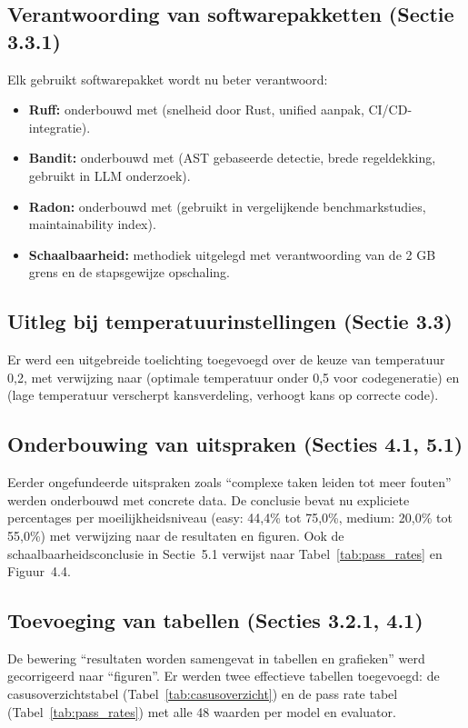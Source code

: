 \subsection{Verantwoording van softwarepakketten (Sectie 3.3.1)}
Elk gebruikt softwarepakket wordt nu beter verantwoord:
\begin{itemize}
    \item \textbf{Ruff:} onderbouwd met \autocite{brtnik2025thesis} (snelheid door Rust, unified aanpak, CI/CD-integratie).
    \item \textbf{Bandit:} onderbouwd met \autocite{Alrashedy2025} (AST gebaseerde detectie, brede regeldekking, gebruikt in LLM onderzoek).
    \item \textbf{Radon:} onderbouwd met \autocite{Bayram2025,Morrison2023} (gebruikt in vergelijkende benchmarkstudies, maintainability index).
    \item \textbf{Schaalbaarheid:} methodiek uitgelegd met verantwoording van de 2 GB grens en de stapsgewijze opschaling.
\end{itemize}

\subsection{Uitleg bij temperatuurinstellingen (Sectie 3.3)}
Er werd een uitgebreide toelichting toegevoegd over de keuze van temperatuur 0,2, met verwijzing naar \textcite{Arora2024} (optimale temperatuur onder 0,5 voor codegeneratie) en \textcite{Chen2021} (lage temperatuur verscherpt kansverdeling, verhoogt kans op correcte code).

\subsection{Onderbouwing van uitspraken (Secties 4.1, 5.1)}
Eerder ongefundeerde uitspraken zoals ``complexe taken leiden tot meer fouten'' werden onderbouwd met concrete data. De conclusie bevat nu expliciete percentages per moeilijkheidsniveau (easy: 44,4\% tot 75,0\%, medium: 20,0\% tot 55,0\%) met verwijzing naar de resultaten en figuren. Ook de schaalbaarheidsconclusie in Sectie~5.1 verwijst naar Tabel~\ref{tab:pass_rates} en Figuur~4.4.

\subsection{Toevoeging van tabellen (Secties 3.2.1, 4.1)}
De bewering ``resultaten worden samengevat in tabellen en grafieken'' werd gecorrigeerd naar ``figuren''. Er werden twee effectieve tabellen toegevoegd: de casusoverzichtstabel (Tabel~\ref{tab:casusoverzicht}) en de pass rate tabel (Tabel~\ref{tab:pass_rates}) met alle 48 waarden per model en evaluator.

